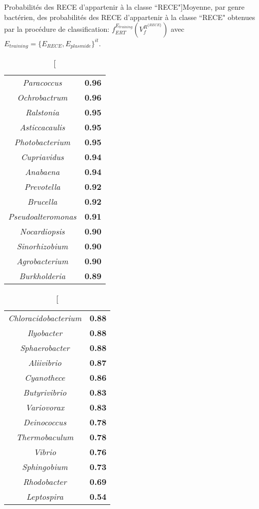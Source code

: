 \begin{table}[H]
	\caption[Probabilités des RECE d'appartenir à la classe ``RECE"]{Moyenne, par genre bactérien, des probabilités des RECE d'appartenir à la classe ``RECE" obtenues par la procédure de classification: $f_{ERT}^{E_{training}}(V_{f}^{R^{\{RECE\}}})$ avec $E_{training}=\{E_{RECE},E_{plasmide}\}^{it}$}.\label{tabrecemean}
	\begin{minipage}[t]{0.5\textwidth}
		\small
		\vspace{0cm}
		\centering
		\begin{tabular}{>{\itshape}c>{\bfseries}c}
			Paracoccus&0.96\\
			Ochrobactrum&0.96\\
			Ralstonia&0.95\\
			Asticcacaulis&0.95\\
			Photobacterium&0.95\\
			Cupriavidus&0.94\\
			Anabaena&0.94\\
			Prevotella&0.92\\
			Brucella&0.92\\
			Pseudoalteromonas&0.91\\
			Nocardiopsis&0.90\\
			Sinorhizobium&0.90\\
			Agrobacterium&0.90\\
			Burkholderia&0.89\\
		\end{tabular}
	\end{minipage}
	\begin{minipage}[t]{0.5\textwidth}
	\small
	\vspace{0cm}
	\centering
		\begin{tabular}{>{\itshape}c>{\bfseries}c}
			Chloracidobacterium&0.88\\
			Ilyobacter&0.88\\
			Sphaerobacter&0.88\\
			Aliivibrio&0.87\\
			Cyanothece&0.86\\
			Butyrivibrio&0.83\\
			Variovorax&0.83\\
			Deinococcus&0.78\\
			Thermobaculum&0.78\\
			Vibrio&0.76\\
			Sphingobium&0.73\\
			Rhodobacter&0.69\\
			Leptospira&0.54\\
		\end{tabular}
	\end{minipage}
\end{table}

